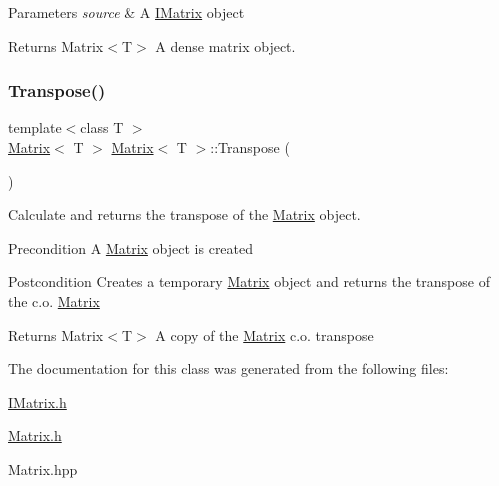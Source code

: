 \begin{DoxyParams}{Parameters}
{\em source} & A \mbox{\hyperlink{class_i_matrix}{I\+Matrix}} object \\
\hline
\end{DoxyParams}
\begin{DoxyReturn}{Returns}
Matrix$<$\+T$>$ A dense matrix object. 
\end{DoxyReturn}
\mbox{\label{class_matrix_a86d55a5db43b641f4e8fb2b302ccc599}} 
\subsubsection{\texorpdfstring{Transpose()}{Transpose()}}
{\footnotesize\ttfamily template$<$class T $>$ \\
\mbox{\hyperlink{class_matrix}{Matrix}}$<$ T $>$ \mbox{\hyperlink{class_matrix}{Matrix}}$<$ T $>$\+::Transpose (\begin{DoxyParamCaption}{ }\end{DoxyParamCaption})}



Calculate and returns the transpose of the \mbox{\hyperlink{class_matrix}{Matrix}} object. 

\begin{DoxyPrecond}{Precondition}
A \mbox{\hyperlink{class_matrix}{Matrix}} object is created 
\end{DoxyPrecond}
\begin{DoxyPostcond}{Postcondition}
Creates a temporary \mbox{\hyperlink{class_matrix}{Matrix}} object and returns the transpose of the c.\+o. \mbox{\hyperlink{class_matrix}{Matrix}} 
\end{DoxyPostcond}
\begin{DoxyReturn}{Returns}
Matrix$<$\+T$>$ A copy of the \mbox{\hyperlink{class_matrix}{Matrix}} c.\+o. transpose 
\end{DoxyReturn}


The documentation for this class was generated from the following files\+:\begin{DoxyCompactItemize}
\item 
\mbox{\hyperlink{_i_matrix_8h}{I\+Matrix.\+h}}\item 
\mbox{\hyperlink{_matrix_8h}{Matrix.\+h}}\item 
Matrix.\+hpp\end{DoxyCompactItemize}
